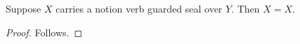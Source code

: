 

\begin{proposition}\label{notion_verb_formation_missing}
    Suppose $X$ carries a notion verb guarded seal over $Y$.
    Then $X=X$.
\end{proposition}
\begin{proof}
    Follows.
\end{proof}
